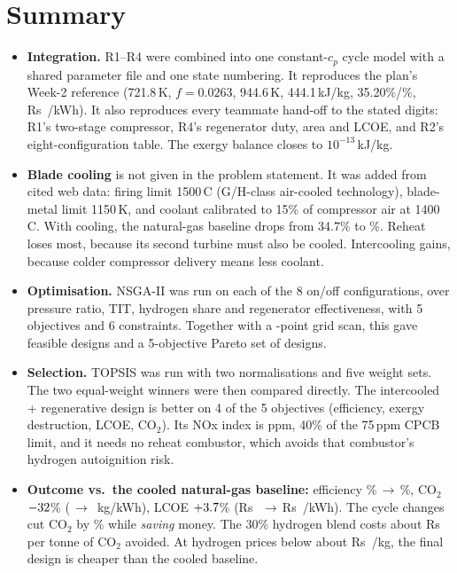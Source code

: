 \documentclass[10.5pt,a4paper]{article}
\newcommand{\Rs}{Rs~}
\begin{document}
\section*{Summary}
\begin{itemize}[leftmargin=1.2em,itemsep=2pt]
\item \textbf{Integration.} R1--R4 were combined into one constant-$c_p$ cycle model with a shared parameter file and one state numbering. It reproduces the plan's Week-2 reference (721.8\,K, $f=0.0263$, 944.6\,K, 444.1\,kJ/kg, 35.20\%/\buEta\%, \Rs\buLCOE/kWh). It also reproduces every teammate hand-off to the stated digits: R1's two-stage compressor, R4's regenerator duty, area and LCOE, and R2's eight-configuration table. The exergy balance closes to $10^{-13}$\,kJ/kg.
\item \textbf{Blade cooling} is not given in the problem statement. It was added from cited web data: firing limit 1500\,\textdegree C (G/H-class air-cooled technology), blade-metal limit 1150\,K, and coolant calibrated to 15\% of compressor air at 1400\,\textdegree C. With cooling, the natural-gas baseline drops from 34.7\% to \bcEta\%. Reheat loses most, because its second turbine must also be cooled. Intercooling gains, because colder compressor delivery means less coolant.
\item \textbf{Optimisation.} NSGA-II was run on each of the 8 on/off configurations, over pressure ratio, TIT, hydrogen share and regenerator effectiveness, with 5 objectives and 6 constraints. Together with a \nScan-point grid scan, this gave \nFeas{} feasible designs and a 5-objective Pareto set of \nPareto{} designs.
\item \textbf{Selection.} TOPSIS was run with two normalisations and five weight sets. The two equal-weight winners were then compared directly. The intercooled + regenerative design is better on 4 of the 5 objectives (efficiency, exergy destruction, LCOE, CO$_2$). Its NOx index is \finNOx{} ppm, 40\% of the 75\,ppm CPCB limit, and it needs no reheat combustor, which avoids that combustor's hydrogen autoignition risk.
\item \textbf{Outcome vs.\ the cooled natural-gas baseline:} efficiency \bcEta\%\,$\rightarrow$\,\finEta\%, CO$_2$ $-32$\% (\bcCO\,$\rightarrow$\,\finCO{} kg/kWh), LCOE $+3.7$\% (\Rs\bcLCOE\,$\rightarrow$\,\Rs\finLCOE/kWh). The cycle changes cut CO$_2$ by \dCOcyclepct\% while \emph{saving} money. The 30\% hydrogen blend costs about \Rs\abateHtwo{} per tonne of CO$_2$ avoided. At hydrogen prices below about \Rs\parityPrice/kg, the final design is cheaper than the cooled baseline.
\end{itemize}
\end{document}
